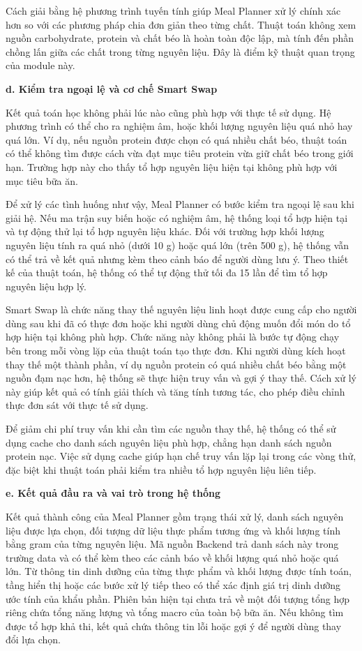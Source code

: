 \documentclass[12pt, a4paper]{report}
\begin{document}
Cách giải bằng hệ phương trình tuyến tính giúp Meal Planner xử lý chính xác hơn so với các phương pháp chia đơn giản theo từng chất. Thuật toán không xem nguồn carbohydrate, protein và chất béo là hoàn toàn độc lập, mà tính đến phần chồng lấn giữa các chất trong từng nguyên liệu. Đây là điểm kỹ thuật quan trọng của module này.

\textbf{d. Kiểm tra ngoại lệ và cơ chế Smart Swap}

Kết quả toán học không phải lúc nào cũng phù hợp với thực tế sử dụng. Hệ phương trình có thể cho ra nghiệm âm, hoặc khối lượng nguyên liệu quá nhỏ hay quá lớn. Ví dụ, nếu nguồn protein được chọn có quá nhiều chất béo, thuật toán có thể không tìm được cách vừa đạt mục tiêu protein vừa giữ chất béo trong giới hạn. Trường hợp này cho thấy tổ hợp nguyên liệu hiện tại không phù hợp với mục tiêu bữa ăn.

Để xử lý các tình huống như vậy, Meal Planner có bước kiểm tra ngoại lệ sau khi giải hệ. Nếu ma trận suy biến hoặc có nghiệm âm, hệ thống loại tổ hợp hiện tại và tự động thử lại tổ hợp nguyên liệu khác. Đối với trường hợp khối lượng nguyên liệu tính ra quá nhỏ (dưới 10 g) hoặc quá lớn (trên 500 g), hệ thống vẫn có thể trả về kết quả nhưng kèm theo cảnh báo để người dùng lưu ý. Theo thiết kế của thuật toán, hệ thống có thể tự động thử tối đa 15 lần để tìm tổ hợp nguyên liệu hợp lý.

Smart Swap là chức năng thay thế nguyên liệu linh hoạt được cung cấp cho người dùng sau khi đã có thực đơn hoặc khi người dùng chủ động muốn đổi món do tổ hợp hiện tại không phù hợp. Chức năng này không phải là bước tự động chạy bên trong mỗi vòng lặp của thuật toán tạo thực đơn. Khi người dùng kích hoạt thay thế một thành phần, ví dụ nguồn protein có quá nhiều chất béo bằng một nguồn đạm nạc hơn, hệ thống sẽ thực hiện truy vấn và gợi ý thay thế. Cách xử lý này giúp kết quả có tính giải thích và tăng tính tương tác, cho phép điều chỉnh thực đơn sát với thực tế sử dụng.

Để giảm chi phí truy vấn khi cần tìm các nguồn thay thế, hệ thống có thể sử dụng cache cho danh sách nguyên liệu phù hợp, chẳng hạn danh sách nguồn protein nạc. Việc sử dụng cache giúp hạn chế truy vấn lặp lại trong các vòng thử, đặc biệt khi thuật toán phải kiểm tra nhiều tổ hợp nguyên liệu liên tiếp.

\textbf{e. Kết quả đầu ra và vai trò trong hệ thống}

Kết quả thành công của Meal Planner gồm trạng thái xử lý, danh sách nguyên liệu được lựa chọn, đối tượng dữ liệu thực phẩm tương ứng và khối lượng tính bằng gram của từng nguyên liệu. Mã nguồn Backend trả danh sách này trong trường data và có thể kèm theo các cảnh báo về khối lượng quá nhỏ hoặc quá lớn. Từ thông tin dinh dưỡng của từng thực phẩm và khối lượng được tính toán, tầng hiển thị hoặc các bước xử lý tiếp theo có thể xác định giá trị dinh dưỡng ước tính của khẩu phần. Phiên bản hiện tại chưa trả về một đối tượng tổng hợp riêng chứa tổng năng lượng và tổng macro của toàn bộ bữa ăn. Nếu không tìm được tổ hợp khả thi, kết quả chứa thông tin lỗi hoặc gợi ý để người dùng thay đổi lựa chọn.
\end{document}

